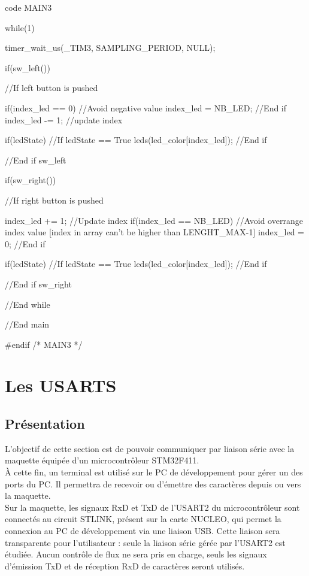 {\begin{Cpp}{code MAIN3}
{	while(1) {
	
        timer_wait_us(_TIM3, SAMPLING_PERIOD, NULL);
        
		if(sw_left()) {  //If left button is pushed

			if(index_led == 0) { //Avoid negative value
				index_led = NB_LED;
			}//End if
			index_led -= 1; //update index

			if(ledState) {  //If ledState == True
				leds(led_color[index_led]);
			}//End if
				
		}//End if sw_left

		if(sw_right()) {  //If right button is pushed

			index_led += 1; //Update index
			if(index_led == NB_LED) { //Avoid overrange index value [index in array can't be higher than LENGHT_MAX-1]
				index_led = 0;
			}//End if
				
			if(ledState) {       //If ledState == True
				leds(led_color[index_led]);
			}//End if
				
		}//End if sw_right

    }//End while    
}//End main

#endif /* MAIN3 */



\end{Cpp}\part{Les USARTS}
\chapter{Présentation}

L'objectif de cette section est de pouvoir communiquer par liaison série avec la maquette équipée d'un microcontrôleur STM32F411.\\
À cette fin, un terminal est utilisé sur le PC de développement pour gérer un des ports du PC. Il permettra de recevoir ou d'émettre des caractères depuis ou vers la maquette.\\

Sur la maquette, les signaux RxD et TxD de l'USART2 du microcontrôleur sont connectés au circuit STLINK, présent sur la carte NUCLEO, qui permet la connexion au PC de développement via une liaison USB. Cette liaison sera transparente pour l'utilisateur : seule la liaison série gérée par l'USART2 est étudiée. Aucun contrôle de flux ne sera pris en charge, seuls les signaux d'émission TxD et de réception RxD de caractères seront utilisés. \\

}
